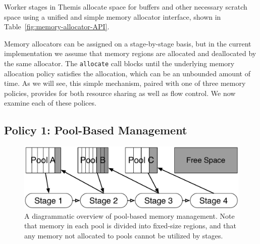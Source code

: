 Worker stages in Themis allocate space for buffers and other necessary
scratch space using a unified and simple memory allocator interface,
shown in Table~\ref{fig:memory-allocator-API}.

\begin{table}
  \centering
  \caption{\label{fig:memory-allocator-API} A summary of the Themis memory
    allocator API.}
\end{table}

Memory allocators can be assigned on a stage-by-stage basis, but in the current
implementation we assume that memory regions are allocated and deallocated by
the same allocator.  The \texttt{allocate} call blocks until the underlying
memory allocation policy satisfies the allocation, which can be an unbounded
amount of time.  As we will see, this simple mechanism, paired with one of
three memory policies, provides for both resource sharing as well as flow
control.  We now examine each of these polices.

\subsection{Policy 1: Pool-Based Management}

\begin{figure}
  \centering
  \includegraphics[width=\columnwidth]{themis/figures/pool_based_manager.pdf}
  \caption{\label{fig:memory_allocators:pool} A diagrammatic overview of
    pool-based memory management. Note that memory in each pool is divided into
  fixed-size regions, and that any memory not allocated to pools cannot be
  utilized by stages.}
\end{figure}

